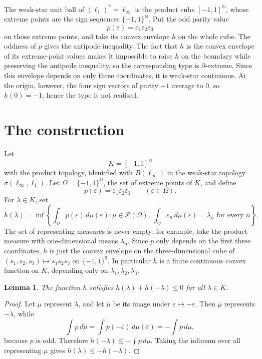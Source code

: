 \documentclass[11pt]{article}
\newtheorem{lemma}{Lemma}
\newcommand{\eps}{\varepsilon}
\newcommand{\N}{\mathbb N}
\newcommand{\bd}{\partial}
\newcommand{\Prob}{\mathcal P}
\begin{document}
The weak-star unit ball of \((\ell_1)^*=\ell_\infty\) is the product cube
\([-1,1]^\N\), whose extreme points are the sign sequences
\(\{-1,1\}^\N\).  Put the odd parity value
\[
  p(\eps)=\eps_1\eps_2\eps_3
\]
on those extreme points, and take its convex envelope \(h\) on the whole cube.
The oddness of \(p\) gives the antipode inequality.  The fact that \(h\) is the
convex envelope of its extreme-point values makes it impossible to raise
\(h\) on the boundary while preserving the antipode inequality, so the
corresponding type is \(\bd\)-extreme.  Since this envelope depends on only
three coordinates, it is weak-star continuous.  At the origin, however, the
four sign vectors of parity \(-1\) average to \(0\), so \(h(0)=-1\); hence the
type is not realised.

\section*{The construction}

Let
\[
  K=[-1,1]^\N
\]
with the product topology, identified with \(B(\ell_\infty)\) in the weak-star
topology \(\sigma(\ell_\infty,\ell_1)\).  Let
\(\Omega=\{-1,1\}^\N\), the set of extreme points of \(K\), and define
\[
  p(\eps)=\eps_1\eps_2\eps_3 \qquad (\eps\in\Omega).
\]
For \(\lambda\in K\), set
\[
  h(\lambda)=
  \inf\left\{
    \int_\Omega p(\eps)\,d\mu(\eps):
    \mu\in\Prob(\Omega),\
    \int_\Omega \eps_n\,d\mu(\eps)=\lambda_n\text{ for every }n
  \right\}.
\]
The set of representing measures is never empty; for example, take the product
measure with one-dimensional means \(\lambda_n\).  Since \(p\) only depends on
the first three coordinates, \(h\) is just the convex envelope on the
three-dimensional cube of
\((s_1,s_2,s_3)\mapsto s_1s_2s_3\) on \(\{-1,1\}^3\).  In particular \(h\) is a
finite continuous convex function on \(K\), depending only on
\(\lambda_1,\lambda_2,\lambda_3\).

\begin{lemma}
\label{lem:antipode}
The function \(h\) satisfies \(h(\lambda)+h(-\lambda)\leq 0\) for all
\(\lambda\in K\).
\end{lemma}

\begin{proof}
Let \(\mu\) represent \(\lambda\), and let \(\check\mu\) be its image under
\(\eps\mapsto -\eps\).  Then \(\check\mu\) represents \(-\lambda\), while
\[
  \int p\,d\check\mu=\int p(-\eps)\,d\mu(\eps)=-\int p\,d\mu,
\]
because \(p\) is odd.  Therefore \(h(-\lambda)\leq -\int p\,d\mu\).  Taking the
infimum over all representing \(\mu\) gives \(h(\lambda)\leq -h(-\lambda)\).
\end{proof}
\end{document}
